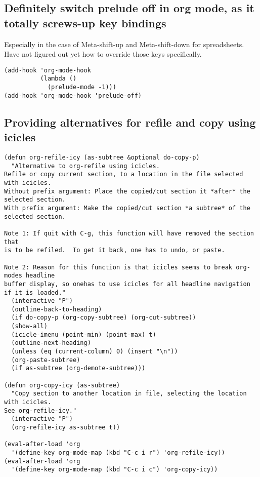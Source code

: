 \documentclass[10pt]{article}
\begin{document}
\subsection{Definitely switch prelude off in org mode, as it totally screws-up key bindings}
\label{sec-3-3}

Especially in the case of Meta-shift-up and Meta-shift-down for spreadsheets.
Have not figured out yet how to override those keys specifically.

\begin{verbatim}
(add-hook 'org-mode-hook
          (lambda ()
            (prelude-mode -1)))
(add-hook 'org-mode-hook 'prelude-off)
\end{verbatim}


\subsection{Providing alternatives for refile and copy using icicles}
\label{sec-3-4}

\begin{verbatim}
(defun org-refile-icy (as-subtree &optional do-copy-p)
  "Alternative to org-refile using icicles.
Refile or copy current section, to a location in the file selected with icicles.
Without prefix argument: Place the copied/cut section it *after* the selected section.
With prefix argument: Make the copied/cut section *a subtree* of the selected section.

Note 1: If quit with C-g, this function will have removed the section that
is to be refiled.  To get it back, one has to undo, or paste.

Note 2: Reason for this function is that icicles seems to break org-modes headline
buffer display, so onehas to use icicles for all headline navigation if it is loaded."
  (interactive "P")
  (outline-back-to-heading)
  (if do-copy-p (org-copy-subtree) (org-cut-subtree))
  (show-all)
  (icicle-imenu (point-min) (point-max) t)
  (outline-next-heading)
  (unless (eq (current-column) 0) (insert "\n"))
  (org-paste-subtree)
  (if as-subtree (org-demote-subtree)))

(defun org-copy-icy (as-subtree)
  "Copy section to another location in file, selecting the location with icicles.
See org-refile-icy."
  (interactive "P")
  (org-refile-icy as-subtree t))

(eval-after-load 'org
  '(define-key org-mode-map (kbd "C-c i r") 'org-refile-icy))
(eval-after-load 'org
  '(define-key org-mode-map (kbd "C-c i c") 'org-copy-icy))
\end{verbatim}
\end{document}

